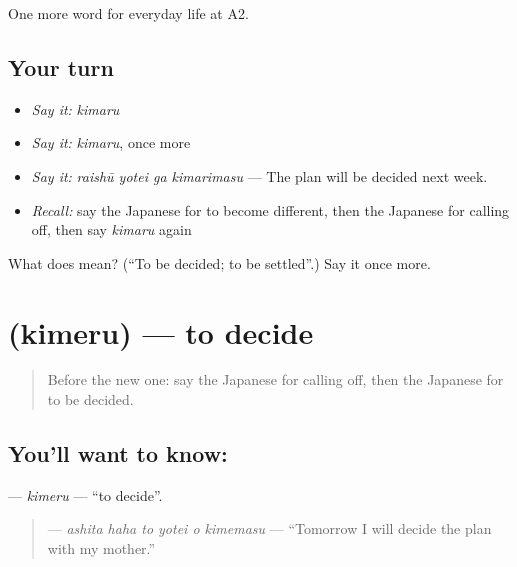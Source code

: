 \begin{grammarlens}[title={What you've built}]
One more word for everyday life at A2.
\end{grammarlens}

\subsection*{Your turn}
\begin{itemize}
\raggedright
  \item \emph{Say it:} \emph{kimaru}
  \item \emph{Say it:} \emph{kimaru}, once more
  \item \emph{Say it:} \emph{raishū yotei ga kimarimasu} — The plan will be decided next week.
  \item \emph{Recall:} say the Japanese for to become different, then the Japanese for calling off, then say \emph{kimaru} again
\end{itemize}

\begin{tcolorbox}[breakable,colback=teal!4,colframe=teal!35!black,title={Before you move on}]
What does  mean? (\textquotedblleft{}To be decided; to be settled\textquotedblright{}.) Say it once more.
\end{tcolorbox}
\section[\texorpdfstring{\ja{きめる} (kimeru)}{きめる (kimeru)}]{ (kimeru) — to decide}

\label{lesson:JA-C168-kimeru}



\begin{quote}
Before the new one: say the Japanese for calling off, then the Japanese for to be decided.
\end{quote}

\subsection*{You'll want to know: }
\textbf{} — \emph{kimeru} — \textquotedblleft{}to decide\textquotedblright{}.

\begin{quote}
\textbf{   } — \emph{ashita haha to yotei o kimemasu} — \textquotedblleft{}Tomorrow I will decide the plan with my mother.\textquotedblright{}
\end{quote}

